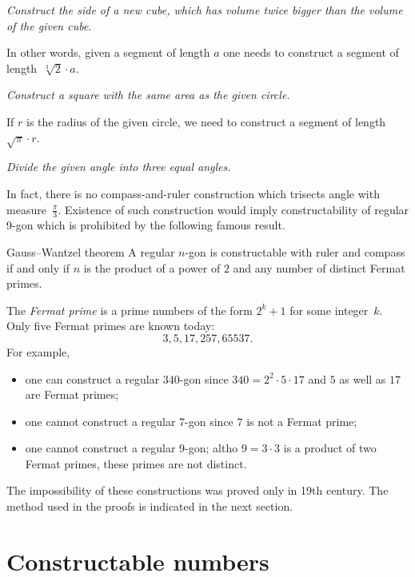 {\it Construct the side of a new cube, 
which has volume twice bigger than the volume of the given cube.} 

\medskip

In other words, 
given a segment of length $a$
one needs to construct a segment of length~$\sqrt[3]{2}\cdot a$.

 {\it Construct a square with the same area as the given circle.} 

\medskip

If $r$ is the radius of the given circle, we need to construct a segment of length~$\sqrt{\pi}\cdot r$. 

{\it Divide the given angle into three equal angles.}

\medskip

In fact, there is no compass-and-ruler construction which trisects angle with measure~$\tfrac\pi3$. 
Existence of such construction would imply constructability of regular 9-gon which is prohibited by the following famous result.

\begin{thm}{Gauss--Wantzel theorem}
A regular $n$-gon is constructable with ruler and compass 
if and only if 
$n$ is the product of a power of $2$ and any number of distinct Fermat primes.
\end{thm}

The \emph{Fermat prime} is a prime numbers of the form $2^k+1$ for some integer~$k$.
Only five Fermat primes are known  today:
$$3, 5, 17, 257, 65537.$$
For example, 
\begin{itemize}
\item one can construct a regular 340-gon since $340=2^2\cdot 5\cdot 17$ and $5$ as well as $17$ are Fermat primes;
\item one cannot construct a regular 7-gon since $7$ is not a Fermat prime;
\item one cannot construct a regular 9-gon; 
altho $9=3\cdot 3$ is a product of two Fermat primes, 
these primes are not distinct.
\end{itemize}

\medskip

The impossibility of these constructions 
was proved only in 19th century.
The method used in the proofs is indicated in the next section.

\section*{Constructable numbers}

